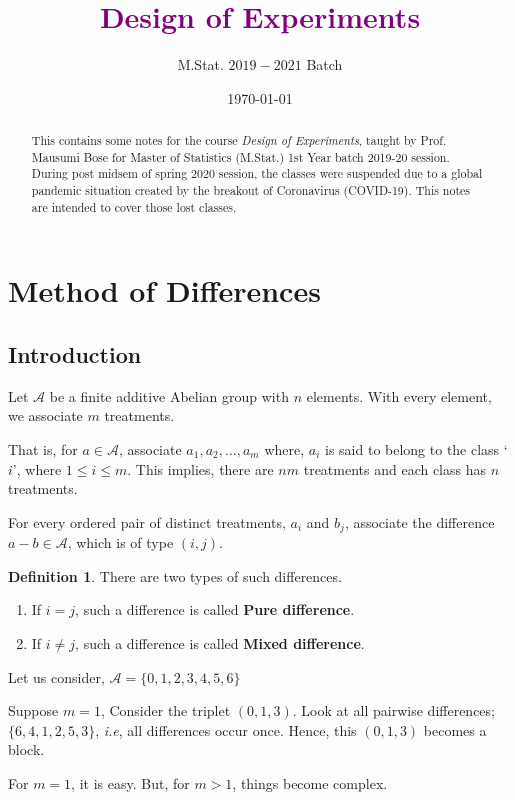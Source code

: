 \documentclass[12pt]{article}
\title{\LARGE \textbf{\textcolor{purple}{Design of Experiments}}}
\author{M.Stat. $2019-2021$ Batch}
\date{\today}
\theoremstyle{definition}
\newtheorem{defn}{Definition}
\newenvironment{definition}{
\begin{tcolorbox}[colback=green!5!white,colframe=green!75!black, parbox = false]\begin{defn} }{\end{defn}\end{tcolorbox} }
\newenvironment{note}{
\begin{tcolorbox}[colback=blue!5!white,colframe=blue!75!black,title=Note, parbox = false] }{\end{tcolorbox} }
\newenvironment{example}[1][\unskip]{
\begin{tcolorbox}[colback=blue!5!white,colframe=blue!75!black, title = {Example #1}, parbox = false] }{\end{tcolorbox} }
\begin{document}
	
\maketitle

\begin{abstract}
    This contains some notes for the course \textit{Design of Experiments}, taught by Prof. Mausumi Bose for Master of Statistics (M.Stat.) 1st Year batch 2019-20 session. During post midsem of spring $2020$ session, the classes were suspended due to a global pandemic situation created by the breakout of Coronavirus (COVID-19). This notes are intended to cover those lost classes.
\end{abstract}
\pagebreak

\tableofcontents
\pagebreak


\section{Method of Differences}

\subsection{Introduction}\label{intro}

Let $\mathcal{A}$ be a finite additive Abelian group with $n$ elements. With every element, we associate $m$ treatments.

That is, for $a \in \mathcal{A}$, associate $a_1, a_2, \ldots, a_m$ where, $a_i$ is said to belong to the class `$i$', 
where $1 \leq i \leq m$. This implies, there are $nm$ treatments and each class has $n$ treatments.

For every ordered pair of distinct treatments, $a_i$ and $b_j$, associate the difference $a-b \in \mathcal{A}$, which is of type $(i,j)$.

\begin{definition}
	There are two types of such differences.
	\begin{enumerate}
		\item If $i = j$, such a difference is called \textbf{Pure difference}.
		\item If $i \neq j$, such a difference is called \textbf{Mixed difference}.
	\end{enumerate}		
\end{definition}


\begin{example}
Let us consider, $\mathcal{A} = \{0,1,2,3,4,5,6\}$

Suppose $m = 1$, Consider the triplet $(0,1,3)$. Look at all pairwise differences; $\{6,4,1,2,5,3\}$, \textit{i.e}, all differences occur once. Hence, this $(0,1,3)$ becomes a block. 

\begin{note}
	For $m = 1$, it is easy. But, for $m > 1$, things become complex.
\end{note}

\end{example}
\end{document}
